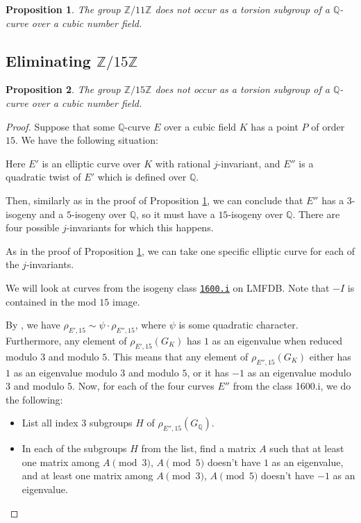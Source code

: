 \documentclass[10pt,a4paper]{amsart}
\newtheorem{proposition}{Proposition}
\newcommand{\Q}{\mathbb{Q}}
\newcommand{\Z}{\mathbb{Z}}
\newcommand{\lmfdb}[1]{%
  \href{https://www.lmfdb.org/EllipticCurve/Q/#1}{\texttt{#1}}%
}
\begin{document}
\begin{proposition}\label{eliminiraj11}
    The group $\Z/11\Z$ does not occur as a torsion subgroup of a $\Q$-curve over a cubic number field.
\end{proposition}

\subsection{Eliminating $\Z/15\Z$} \begin{proposition}\label{eliminiraj15}
    The group $\Z/15\Z$ does not occur as a torsion subgroup of a $\Q$-curve over a cubic number field.
\end{proposition}

\begin{proof}
Suppose that some $\Q$-curve $E$ over a cubic field $K$ has a point $P$ of order $15$.
We have the following situation: 
\begin{center}
\end{center}
Here $E'$ is an elliptic curve over $K$ with rational $j$-invariant, and $E''$ is a quadratic twist of $E'$ which is defined over $\Q$. 

Then, similarly as in the proof of Proposition \ref{eliminiraj11}, we can conclude that $E''$ has a $3$-isogeny and a $5$-isogeny over $\Q$, so it must have a $15$-isogeny over $\Q$. There are four possible $j$-invariants for which this happens.

As in the proof of Proposition \ref{eliminiraj11}, we can take one specific elliptic curve for each of the $j$-invariants.

We will look at curves from the isogeny class \lmfdb{1600.i} on LMFDB. Note that $-I$ is contained in the mod $15$ image.

By , we have $\rho_{E', 15} \sim \psi \cdot \rho_{E'', 15}$, where $\psi$ is some quadratic character. Furthermore, any element of $\rho_{E', 15}(G_K)$ has $1$ as an eigenvalue when reduced modulo $3$ and modulo $5$. This means that any element of $\rho_{E'', 15}(G_K)$ either has $1$ as an eigenvalue modulo $3$ and modulo $5$, or it has $-1$ as an eigenvalue modulo $3$ and modulo $5$. Now, for each of the four curves $E''$ from the class 1600.i, we do the following:

\begin{itemize}
    \item List all index $3$ subgroups $H$ of $\rho_{E'', 15}(G_\Q)$.
    \item In each of the subgroups $H$ from the list, find a matrix $A$ such that at least one matrix among $A \pmod 3$,  $A \pmod 5$ doesn't have $1$ as an eigenvalue, and at least one matrix among $A \pmod 3$, $A \pmod 5$ doesn't have $-1$ as an eigenvalue. 
\end{itemize}


\end{proof}
\end{document}
